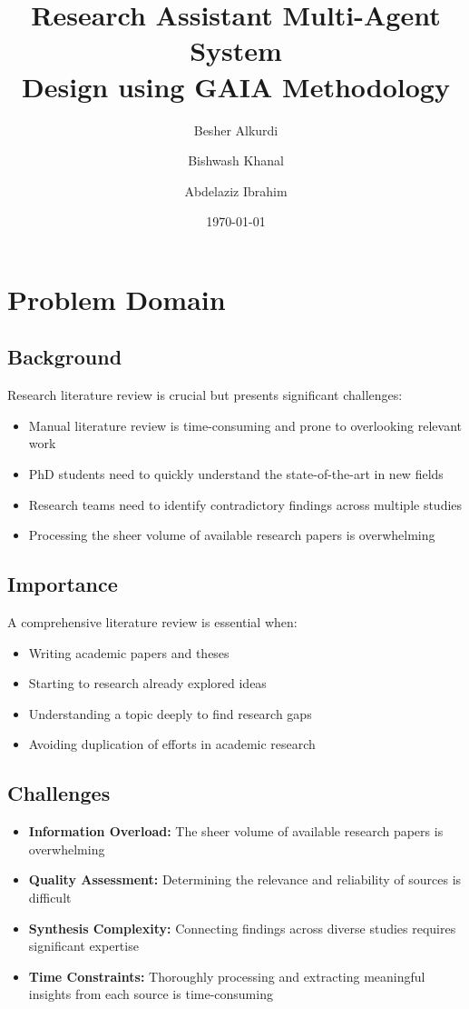 \documentclass[11pt,a4paper]{article}
\title{
    {\LARGE\textbf{Research Assistant Multi-Agent System}}\\
    \vspace{0.5cm}
    {\large\textbf{Design using GAIA Methodology}}\\
    \vspace{0.5cm}
}
\author{Besher Alkurdi \and Bishwash Khanal \and Abdelaziz Ibrahim}
\date{\today}
\begin{document}
\maketitle
\thispagestyle{fancy}

\section*{Problem Domain}
\subsection*{Background}
Research literature review is crucial but presents significant challenges:
\begin{itemize}
    \item Manual literature review is time-consuming and prone to overlooking relevant work
    \item PhD students need to quickly understand the state-of-the-art in new fields
    \item Research teams need to identify contradictory findings across multiple studies
    \item Processing the sheer volume of available research papers is overwhelming
\end{itemize}

\subsection*{Importance}
A comprehensive literature review is essential when:
\begin{itemize}
    \item Writing academic papers and theses
    \item Starting to research already explored ideas
    \item Understanding a topic deeply to find research gaps
    \item Avoiding duplication of efforts in academic research
\end{itemize}

\subsection*{Challenges}
\begin{itemize}
    \item \textbf{Information Overload:} The sheer volume of available research papers is overwhelming
    \item \textbf{Quality Assessment:} Determining the relevance and reliability of sources is difficult
    \item \textbf{Synthesis Complexity:} Connecting findings across diverse studies requires significant expertise
    \item \textbf{Time Constraints:} Thoroughly processing and extracting meaningful insights from each source is time-consuming
\end{itemize}
\end{document}
